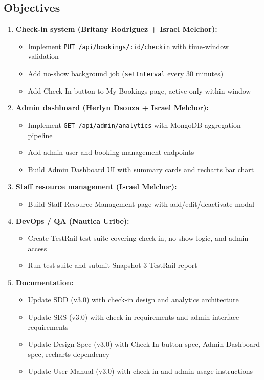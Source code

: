 \documentclass[12pt]{article}
\begin{document}
\subsection{Objectives}
\begin{enumerate}
    \item \textbf{Check-in system (Britany Rodriguez + Israel Melchor):}
        \begin{itemize}
            \item Implement \texttt{PUT /api/bookings/:id/checkin} with time-window validation
            \item Add no-show background job (\texttt{setInterval} every 30 minutes)
            \item Add Check-In button to My Bookings page, active only within window
        \end{itemize}
    \item \textbf{Admin dashboard (Herlyn Dsouza + Israel Melchor):}
        \begin{itemize}
            \item Implement \texttt{GET /api/admin/analytics} with MongoDB aggregation pipeline
            \item Add admin user and booking management endpoints
            \item Build Admin Dashboard UI with summary cards and recharts bar chart
        \end{itemize}
    \item \textbf{Staff resource management (Israel Melchor):}
        \begin{itemize}
            \item Build Staff Resource Management page with add/edit/deactivate modal
        \end{itemize}
    \item \textbf{DevOps / QA (Nautica Uribe):}
        \begin{itemize}
            \item Create TestRail test suite covering check-in, no-show logic, and admin access
            \item Run test suite and submit Snapshot 3 TestRail report
        \end{itemize}
    \item \textbf{Documentation:}
        \begin{itemize}
            \item Update SDD (v3.0) with check-in design and analytics architecture
            \item Update SRS (v3.0) with check-in requirements and admin interface requirements
            \item Update Design Spec (v3.0) with Check-In button spec, Admin Dashboard spec, recharts dependency
            \item Update User Manual (v3.0) with check-in and admin usage instructions
        \end{itemize}
\end{enumerate}
\end{document}
